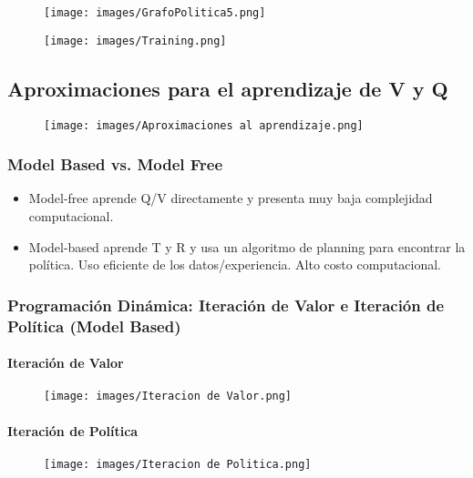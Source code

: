 \documentclass[11pt]{article}
\makeatletter
\def\maxwidth{\ifdim\Gin@nat@width>\linewidth\linewidth
    \else\Gin@nat@width\fi}
\let\Oldincludegraphics\includegraphics
\renewcommand{\includegraphics}[1]{\Oldincludegraphics[width=.8\maxwidth]{#1}}
\makeatother
\begin{document}
    \begin{figure}
\centering
\texttt{[image: images/GrafoPolitica5.png]}
\caption{}
\end{figure}

    \begin{figure}
\centering
\texttt{[image: images/Training.png]}
\caption{}
\end{figure}

    \subsection{Aproximaciones para el aprendizaje de V y
Q}\label{aproximaciones-para-el-aprendizaje-de-v-y-q}

\begin{figure}
\centering
\texttt{[image: images/Aproximaciones al aprendizaje.png]}
\caption{}
\end{figure}

\subsubsection{Model Based vs. Model
Free}\label{model-based-vs.-model-free}

\begin{itemize}
\item
  Model-free aprende Q/V directamente y presenta muy baja complejidad
  computacional.
\item
  Model-based aprende T y R y usa un algoritmo de planning para
  encontrar la política. Uso eficiente de los datos/experiencia. Alto
  costo computacional.
\end{itemize}

    \subsubsection{Programación Dinámica: Iteración de Valor e Iteración de
Política (Model
Based)}\label{programaciuxf3n-dinuxe1mica-iteraciuxf3n-de-valor-e-iteraciuxf3n-de-poluxedtica-model-based}

\paragraph{Iteración de Valor}\label{iteraciuxf3n-de-valor}

\begin{figure}
\centering
\texttt{[image: images/Iteracion de Valor.png]}
\caption{}
\end{figure}

\paragraph{Iteración de Política}\label{iteraciuxf3n-de-poluxedtica}

\begin{figure}
\centering
\texttt{[image: images/Iteracion de Politica.png]}
\caption{}
\end{figure}


    
    
    
    
\end{document}
